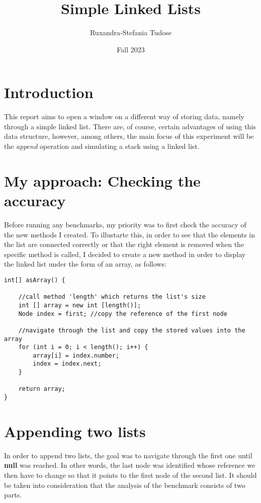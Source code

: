 \documentclass[a4paper,11pt]{article}
\begin{document}
\title{
    \textbf{Simple Linked Lists}
}
\author{Ruxandra-Stefania Tudose}
\date{Fall 2023}

\maketitle

\section*{Introduction}

This report aims to open a window on a different way of storing data, namely through a simple linked list. There are, of course,
certain advantages of using this data structure, however, among others, the main focus of this experiment will be the \textit{append} operation 
and simulating a stack using a linked list.

\section*{My approach: Checking the accuracy}

Before running any benchmarks, my priority was to first check the accuracy of the new methods I created. 
To illustarte this, in order to see that the elements in the list are connected correctly or that the right element is removed when the
specific method is called, 
I decided to create a new method in order to display the linked list under the form of an array, as follows: 


\begin{verbatim}
int[] asArray() {

    //call method 'length' which returns the list's size
    int [] array = new int [length()]; 
    Node index = first; //copy the reference of the first node 

    //navigate through the list and copy the stored values into the array
    for (int i = 0; i < length(); i++) { 
        array[i] = index.number;
        index = index.next; 
    }

    return array;
}
\end{verbatim}


\section*{Appending two lists}

In order to append two lists, the goal was to navigate through the first one until \textbf{null} was reached. In other words, the last node was
identified whose
reference we then have to change so that it points to the first node of the second list. It should be taken into
consideration that the analysis of the benchmark consists of two parts. \newline
\end{document}
